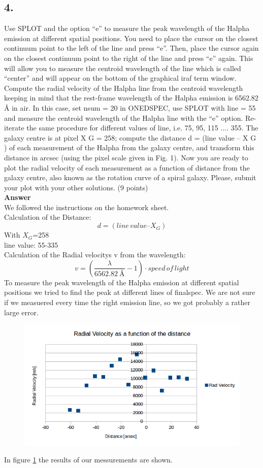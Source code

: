 \documentclass[11pt,a4paper,twoside]{article}
\begin{document}
\subsection{4.}
Use SPLOT and the option “e” to measure the peak wavelength of the Halpha emission
at different spatial positions. You need to place the cursor on the closest continuum point
to the left of the line and press “e”. Then, place the cursor again on the closest continuum
point to the right of the line and press “e” again. This will allow you to measure the centroid
wavelength of the line which is called “center” and will appear on the bottom of the
graphical iraf term window.
Compute the radial velocity of the Halpha line from the centroid wavelength keeping in
mind that the rest-frame wavelength of the Halpha emission is 6562.82 Å in air. In this
case, set nsum = 20 in ONEDSPEC, use SPLOT with line = 55 and measure the centroid
wavelength of the Halpha line with the “e” option. Re-iterate the same procedure for
different values of line, i.e. 75, 95, 115 .... 355. The galaxy centre is at pixel X G = 258;
compute the distance d = (line value – X G ) of each measurement of the Halpha from the
galaxy centre, and transform this distance in arcsec (using the pixel scale given in Fig. 1).
Now you are ready to plot the radial velocity of each measurement as a function of
distance from the galaxy centre, also known as the rotation curve of a spiral galaxy.
Please, submit your plot with your other solutions. (9 points)\\
\textbf{Answer}\\
We followed the instructions on the homework sheet. \\
Calculation of the Distance:
\begin{equation*}
d = (line\,value – X_G )
\end{equation*}
With $X_G$=258\\
line value: 55-335\\ 
Calculation of the Radial velocitys v from the wavelength:
\begin{equation*}
 v=\left( \frac{\lambda}{\SI{6562.82}{\angstrom}}-1\right) \cdot speed\,of\,light
\end{equation*}
To  measure the peak wavelength of the Halpha emission at different spatial positions we tried to find the peak at different lines of finalspec. We are not sure if we measuered every time the right emission line, so we got probably a rather large error.\\

\begin{figure}[h!]
\centering
\includegraphics[width=1\linewidth]{pic/Radial_velocity}
\caption{}
\label{fig:Radial_velocity}
\end{figure}
In figure \ref{fig:Radial_velocity} the results of our messurements are shown.
\end{document}
